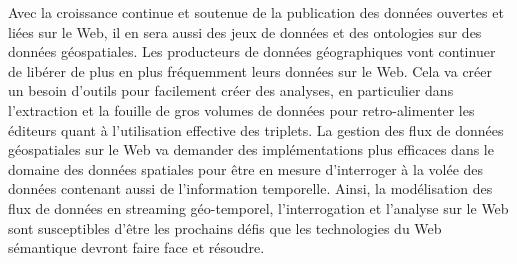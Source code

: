 Avec la croissance continue et soutenue de la publication des donn\'{e}es ouvertes et li\'{e}es sur le Web, il en sera aussi des jeux de donn\'{e}es et des ontologies sur des donn\'{e}es g\'{e}ospatiales. Les producteurs de donn\'{e}es  g\'{e}ographiques vont continuer de lib\'{e}rer de plus en plus fr\'{e}quemment leurs donn\'{e}es sur le Web. Cela va cr\'{e}er un besoin d'outils pour facilement cr\'{e}er des analyses, en particulier dans l'extraction et la fouille de gros volumes de donn\'{e}es pour retro-alimenter les \'{e}diteurs quant \`{a} l'utilisation effective des triplets. La gestion des flux de donn\'{e}es g\'{e}ospatiales sur le Web va demander des impl\'{e}mentations plus efficaces dans le domaine des donn\'{e}es spatiales pour \^{e}tre en mesure d'interroger \`{a} la vol\'{e}e des donn\'{e}es contenant aussi de l'information temporelle. Ainsi, la mod\'{e}lisation des flux de donn\'{e}es en streaming g\'{e}o-temporel, l'interrogation et l'analyse sur le Web sont susceptibles d'\^{e}tre les prochains d\'{e}fis que les technologies du Web s\'{e}mantique devront faire face et r\'{e}soudre.

 